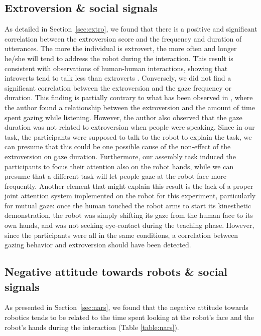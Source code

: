 \subsection{Extroversion \& social signals}
As detailed in Section~\ref{sec:extro}, we found that there is a positive and significant correlation between the extroversion score and the frequency and duration of utterances.
The more the individual is extrovert, the more often and longer he/she will tend to address the robot during the interaction. 
This result is consistent with observations of human-human interactions, showing that introverts tend to talk less than extroverts \cite{Scherer1981}. 
Conversely, we did not find a significant correlation between the extroversion and the gaze frequency or duration. This finding is partially contrary to what has been observed in \cite{Iizuka1992}, where the author found a relationship between the extroversion and the amount of time spent gazing while listening. However, the author also observed that the gaze duration was not related to extroversion when people were speaking. Since in our task, the participants were supposed to talk to the robot to explain the task, we can presume that this could be one possible cause of the non-effect of the extroversion on gaze duration. Furthermore, our assembly task induced the participants to focus their attention also on the robot hands, while we can presume that a different task will let people gaze at the robot face more frequently.
Another element that might explain this result is the lack of a proper joint attention system implemented on the robot for this experiment, particularly for mutual gaze: once the human touched the robot arms to start its kinesthetic demonstration, the robot was simply shifting its gaze from the human face to its own hands, and was not seeking eye-contact during the teaching phase.
However, since the participants were all in the same conditions, a correlation between gazing behavior and extroversion should have been detected.

\subsection{Negative attitude towards robots \& social signals} 
As presented in Section~\ref{sec:nars}, we found that the negative attitude towards robotics tends to be related to the time spent looking at the robot's face and the robot's hands during the interaction (Table \ref{table:nars}).

